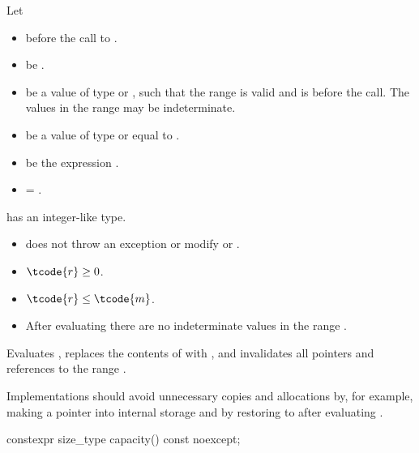 \begin{itemdescr}
\pnum
Let
\begin{itemize}
\item
{} before the call to .
\item
{} be .
\item
{} be a value of type  or ,
such that the range  is valid and
 is  before the call.
The values in the range  may be indeterminate.
\item
{} be a value of type  or 
equal to .
\item
{} be the expression .
\item
{} = .
\end{itemize}

\pnum
\mandates
{} has an integer-like type.

\pnum
\expects
\begin{itemize}
\item
{} does not throw an exception or modify  or .
\item
$\tcode{r} \geq 0$.
\item
$\tcode{r} \leq \tcode{m}$.
\item
After evaluating 
there are no indeterminate values in the range .
\end{itemize}

\pnum
\effects
Evaluates ,
replaces the contents of  with , and
invalidates all pointers and references to the range .

\pnum
\recommended
Implementations should avoid unnecessary copies and allocations
by, for example, making  a pointer into internal storage and
by restoring  to  after evaluating .
\end{itemdescr}

%
\begin{itemdecl}
constexpr size_type capacity() const noexcept;
\end{itemdecl}

